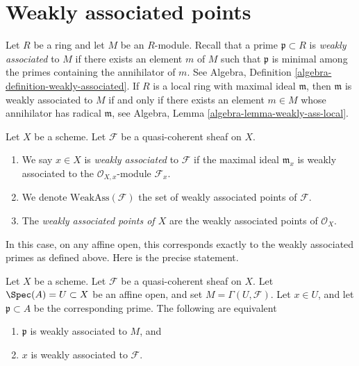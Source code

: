 \section{Weakly associated points}
\label{section-weakly-associated}

\noindent
Let $R$ be a ring and let $M$ be an $R$-module.
Recall that a prime $\mathfrak p \subset R$ is {\it weakly associated}
to $M$ if there exists an element $m$ of $M$ such that $\mathfrak p$ is
minimal among the primes containing the annihilator of $m$. See
Algebra, Definition \ref{algebra-definition-weakly-associated}.
If $R$ is a local ring with maximal ideal $\mathfrak m$, then
$\mathfrak m$ is weakly associated to $M$ if and only if there exists an
element $m \in M$ whose annihilator has radical $\mathfrak m$, see
Algebra, Lemma \ref{algebra-lemma-weakly-ass-local}.

\begin{definition}
\label{definition-weakly-associated}
Let $X$ be a scheme.
Let $\mathcal{F}$ be a quasi-coherent sheaf on $X$.
\begin{enumerate}
\item We say $x \in X$ is {\it weakly associated} to $\mathcal{F}$
if the maximal ideal $\mathfrak m_x$ is weakly associated to the
$\mathcal{O}_{X, x}$-module $\mathcal{F}_x$.
\item We denote $\text{WeakAss}(\mathcal{F})$ the set of weakly associated
points of $\mathcal{F}$.
\item The {\it weakly associated points of $X$} are the weakly associated
points of $\mathcal{O}_X$.
\end{enumerate}
\end{definition}

\noindent
In this case, on any affine open, this corresponds exactly to the
weakly associated primes as defined above. Here is the precise statement.

\begin{lemma}
\label{lemma-weakly-associated-affine-open}
Let $X$ be a scheme. Let $\mathcal{F}$ be a quasi-coherent sheaf on $X$.
Let $\Spec(A) = U \subset X$ be an affine open, and set
$M = \Gamma(U, \mathcal{F})$.
Let $x \in U$, and let $\mathfrak p \subset A$ be the corresponding prime.
The following are equivalent
\begin{enumerate}
\item $\mathfrak p$ is weakly associated to $M$, and
\item $x$ is weakly associated to $\mathcal{F}$.
\end{enumerate}
\end{lemma}

